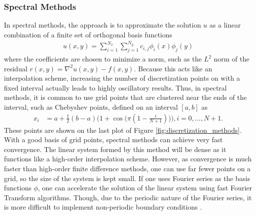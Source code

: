 \subsubsection{Spectral Methods}

In spectral methods, the approach is to approximate the solution $u$ as a linear combination of a finite set of orthogonal basis functions
\begin{align}
    u(x,y) = \sum_{i=1}^{N_x} \sum_{j=1}^{N_y} c_{i,j} \phi_{i}(x) \phi_{j}(y)
\end{align}
where the coefficients are chosen to minimize a norm, such as the $L^2$ norm of the residual $r(x,y) = \nabla^2 u(x,y) - f(x,y)$. Because this acts like an interpolation scheme, increasing the number of discretization points on with a fixed interval actually leads to highly oscillatory results. Thus, in spectral methods, it is common to use grid points that are clustered near the ends of the interval, such as Chebyshev points, defined on an interval $[a,b]$ as
\begin{align}
    x_i &= a + \frac{1}{2}(b - a)\Big(1 + \cos \big( \pi (1 - \frac{i}{N + 1}) \big) \Big), i = 0, ..., N + 1.
\end{align}
These points are shown on the last plot of Figure \ref{fig:discretization_methods}. With a good basis of grid points, spectral methods can achieve very fast convergence. The linear system formed by this method will be dense as it functions like a high-order interpolation scheme. However, as convergence is much faster than high-order finite difference methods, one can use far fewer points on a grid, so the size of the system is kept small. If one uses Fourier series as the basis functions $\phi$, one can accelerate the solution of the linear system using fast Fourier Transform algorithms. Though, due to the periodic nature of the Fourier series, it is more difficult to implement non-periodic boundary conditions \citep{leveque2007finite,townsend2015automatic}.



